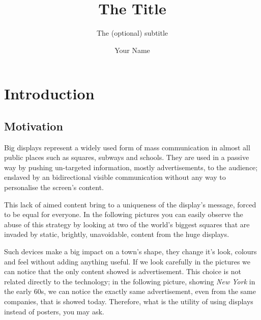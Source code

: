 \documentclass[]{usiinfbachelorproject}
\author{Your Name}
\title{The Title}
\subtitle{The (optional) subtitle}
\begin{document}
\maketitle

\section{Introduction}
\subsection{Motivation}

Big displays represent a widely used form of mass communication in almost all public places such as squares, subways and schools. They are used in a passive way by pushing un-targeted information, mostly advertisements, to the audience; enslaved by an bidirectional visible communication without any way to personalise the screen's content.

This lack of aimed content bring to a uniqueness of the display's message, forced to be equal for everyone.
In the following pictures you can easily observe the abuse of this strategy by looking at two of the world's biggest squares that are invaded by static, brightly, unavoidable, content from the huge displays.
\begin{figure}[H]
  \centering
  \hfill
\end{figure} 

Such devices make a big impact on a town's shape, they change it's look, colours and feel without adding anything useful. If we look carefully in the pictures we can notice that the only content showed is advertisement. This choice is not related directly to the technology; in the following picture, showing \emph{New York} in the early 60s, we can notice the exactly same advertisement, even from the same companies, that is showed today. Therefore, what is the utility of using displays instead of posters, you may ask.
\end{document}
